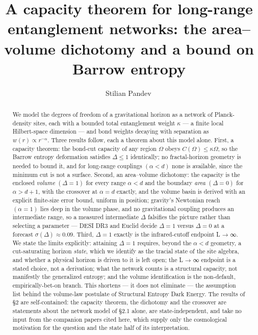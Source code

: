 \documentclass[aps,prd,preprint,nofootinbib,superscriptaddress]{revtex4-2}
\begin{document}
\title{A capacity theorem for long-range entanglement networks: the
area--volume dichotomy and a bound on Barrow entropy}

\author{Stilian Pandev\,}

\begin{abstract}
We model the degrees of freedom of a gravitational horizon as a network
of Planck-density sites, each with a bounded total entanglement weight
\(\kappa\) --- a finite local Hilbert-space dimension --- and bond
weights decaying with separation as \(w(r) \propto  r^{-\alpha }\).
Three results follow, each a theorem about this model alone. First, a
capacity theorem: the bond-cut capacity of any region \(\Omega\) obeys
\(C(\Omega ) \leq  \kappa\)\textbar{}\(\Omega\)\textbar, so the Barrow
entropy deformation satisfies \textbf{\(\Delta  \leq  1\)} identically;
no fractal-horizon geometry is needed to bound it, and for long-range
couplings \((\alpha  < d)\) none is available, since the minimum cut is
not a surface. Second, an area--volume dichotomy: the capacity is the
enclosed \emph{volume} \((\Delta  = 1)\) for every range \(\alpha  < d\)
and the boundary \emph{area} \((\Delta  = 0)\) for \(\alpha  > d + 1\),
with the crossover at \(\alpha  = d\) exactly, and the volume basin is
derived with an explicit finite-size error bound, uniform in position;
gravity's Newtonian reach \((\alpha  = 1)\) lies deep in the volume
phase, and no gravitational coupling produces an intermediate range, so
a measured intermediate \(\Delta\) falsifies the picture rather than
selecting a parameter --- DESI DR3 and Euclid decide \(\Delta  = 1\)
versus \(\Delta  = 0\) at a forecast \(\sigma (\Delta ) \approx  0.09\).
Third, \(\Delta  = 1\) exactly is the infrared-cutoff endpoint L → ∞. We
state the limits explicitly: attaining \(\Delta  = 1\) requires, beyond
the \(\alpha  < d\) geometry, a cut-saturating horizon \emph{state},
which we identify as the tracial state of the site algebra, and whether
a physical horizon is driven to it is left open; the L → ∞ endpoint is a
stated choice, not a derivation; what the network counts is a structural
capacity, not manifestly the generalized entropy; and the volume
identification is the non-default, empirically-bet-on branch. This
shortens --- it does not eliminate --- the assumption list behind the
volume-law postulate of Structural Entropy Dark Energy. The results of
§2 are self-contained: the capacity theorem, the dichotomy and the
crossover are statements about the network model of §2.1 alone, are
state-independent, and take no input from the companion papers cited
here, which supply only the cosmological motivation for the question and
the state half of its interpretation.
\end{abstract}
\end{document}
